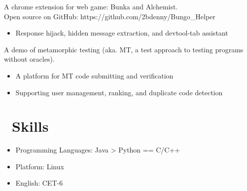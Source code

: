 \documentclass{resume}
\begin{document}
A chrome extension for web game: Bunka and Alchemist. \\
Open source on GitHub: https://github.com/2bdenny/Bungo\_Helper
\begin{itemize}
  \item Response hijack, hidden message extraction, and devtool-tab assistant
\end{itemize}

A demo of metamorphic testing (aka. MT, a test approach to testing programs without oracles).
\begin{itemize}
  \item A platform for MT code submitting and verification
  \item Supporting user management, ranking, and duplicate code detection
\end{itemize}


\section{\faCogs\ Skills}
\begin{itemize}[parsep=0.5ex]
  \item Programming Languages: Java > Python == C/C++
  \item Platform: Linux
  \item English: CET-6
\end{itemize}



\end{document}
